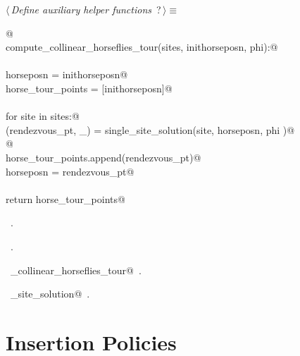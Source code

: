 \documentclass[11.5pt]{report}
\begin{document}
\newchunk 
\begin{flushleft} \small
\begin{minipage}{\linewidth}\label{scrap33}\raggedright\small
{} $\langle\,${\itshape Define auxiliary helper functions}\nobreak\ {\footnotesize {?}}$\,\rangle\equiv$
\vspace{-1ex}
\begin{list}{}{} \item
\mbox{}\verb@   @\\
\mbox{}\verb@def compute_collinear_horseflies_tour(sites, inithorseposn, phi):@\\
\mbox{}\verb@@\\
\mbox{}\verb@      horseposn         = inithorseposn@\\
\mbox{}\verb@      horse_tour_points = [inithorseposn]@\\
\mbox{}\verb@@\\
\mbox{}\verb@      for site in sites:@\\
\mbox{}\verb@          (rendezvous_pt, _) = single_site_solution(site, horseposn, phi )@\\
\mbox{}\verb@            @\\
\mbox{}\verb@          horse_tour_points.append(rendezvous_pt)@\\
\mbox{}\verb@          horseposn = rendezvous_pt@\\
\mbox{}\verb@@\\
\mbox{}\verb@      return horse_tour_points@\\
\mbox{}\verb@@{\NWsep}
\end{list}
\vspace{-1.5ex}
\footnotesize
\begin{list}{}{\setlength{\itemsep}{-\parsep}\setlength{\itemindent}{-\leftmargin}}
\item \NWtxtMacroDefBy\ .
\item \NWtxtMacroRefIn\ .
\item \NWtxtIdentsDefed\nobreak\  \verb@compute_collinear_horseflies_tour@\nobreak\ .\item \NWtxtIdentsUsed\nobreak\  \verb@single_site_solution@\nobreak\ .
\item{}
\end{list}
\end{minipage}\vspace{4ex}
\end{flushleft}
\section{Insertion Policies} 
\label{subsec:insertion-policies}
\end{document}
